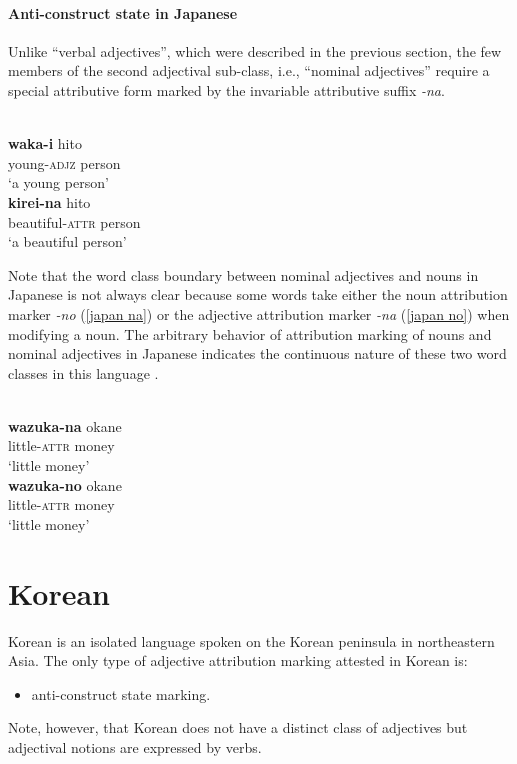 \paragraph*{Anti\hyp{}construct state in Japanese}
Unlike “verbal adjectives”, which were described in the previous section, the few members of the second adjectival sub-class, i.e., “nominal adjectives” require a special attributive form marked by the invariable attributive suffix \textit{-na}.
\begin{exe}
\begin{xlist}
\\
\gll	\textbf{waka-i} hito\\
	young-\textsc{adjz} person\\
\glt	‘a young person’
\\
\gll	\textbf{kirei-na} hito\\
	beautiful-\textsc{attr} person\\
\glt	‘a beautiful person’
\end{xlist}
\end{exe}
Note that the word class boundary between nominal adjectives and nouns in Japanese is not always clear because some words take either the noun attribution marker \textit{-no} (\ref{japan na}) or the adjective attribution marker \textit{-na} (\ref{japan no}) when modifying a noun. The arbitrary behavior of attribution marking of nouns and nominal adjectives in Japanese indicates the continuous nature of these two word classes in this language \citep[79–80]{pustet1989}.

\newpage 
\begin{exe}
\begin{xlist}
\\
\label{japan na}
\gll	\textbf{wazuka-na} okane\\
	little-\textsc{attr} money\\
\glt	‘little money’
\\
\label{japan no}
\gll	\textbf{wazuka-no} okane\\
	little-\textsc{attr} money\\
\glt	‘little money’
\end{xlist}
\end{exe}

\section{Korean}
Korean is an isolated language spoken on the Korean peninsula in northeastern Asia. The only type of adjective attribution marking attested in Korean is:
\begin{itemize}
\item anti\hyp{}construct state marking.
\end{itemize}
Note, however, that Korean does not have a distinct class of adjectives but adjectival notions are expressed by verbs.

